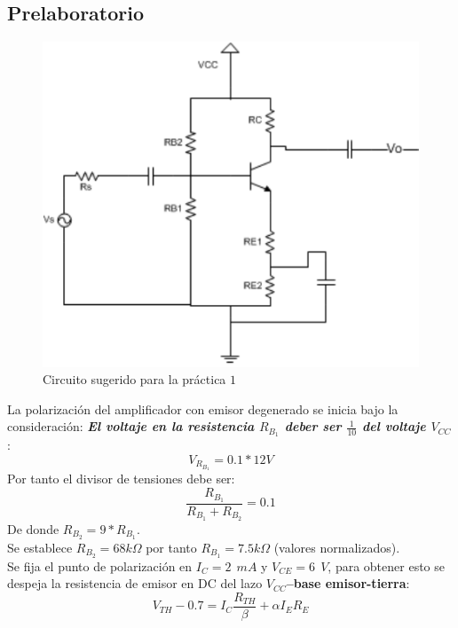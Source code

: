 \documentclass[11pt,graphicx,caption,rotating]{article}
\begin{document}
\subsection{Prelaboratorio}\label{Prelaboratorio}
\noindent
\begin{figure}[H]
	\centering
		\includegraphics[scale=0.4]{circuit_lab_1a.png}
	\caption{Circuito sugerido para la práctica $1$}
	\label{fig1}
\end{figure}
\noindent
La polarización del amplificador con emisor degenerado se inicia bajo la consideración: \textbf{\textit{El voltaje en la resistencia $R_{B_{1}}$ deber ser $\frac{1}{10}$ del voltaje $V_{CC}$}}:
\begin{equation}
 V_{R_{B_1}}= 0.1*12V
\label{ecu1}
\end{equation}
\noindent
Por tanto el divisor de tensiones debe ser:
\begin{equation}
 \frac{R_{B_1}}{R_{B_1}+R_{B_2}}  = 0.1
\label{ecu2}
\end{equation}
\noindent
De donde $R_{B_2}= 9*R_{B_1}$.\\ Se establece $R_{B_2}= 68 k\Omega$ por tanto $R_{B_1}=7.5 k\Omega$ (valores normalizados).\\
Se fija el punto de polarización en $I_C= 2\ \ mA$ y $V_{CE}= 6\ \ V$, para obtener esto se despeja la resistencia de emisor en DC del lazo \textbf{$V_{CC}$–base emisor-tierra}:
\begin{equation}
 V_{TH} - 0.7= I_C\frac{R_{TH}}{\beta}+ \alpha I_{E} R_{E}
\label{ecu3}
\end{equation}
\end{document}

